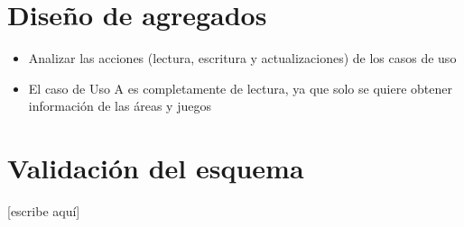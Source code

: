 \documentclass[]{article}
\begin{document}
\section{Diseño de agregados}
\label{sec:agregados}
\begin{itemize}
    \item Analizar las acciones (lectura, escritura y actualizaciones) de los casos de uso
    \item El caso de Uso A es completamente de lectura, ya que solo se quiere obtener información de las áreas y juegos
\end{itemize}

\section{Validación del esquema}
\label{sec:esquema}
[escribe aquí]
\end{document}

